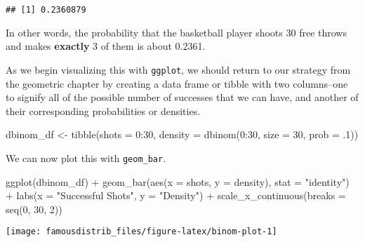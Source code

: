 \documentclass[
]{article}
\newenvironment{Shaded}{\begin{snugshade}}{\end{snugshade}}
\newcommand{\AttributeTok}[1]{\textcolor[rgb]{0.77,0.63,0.00}{#1}}
\newcommand{\DecValTok}[1]{\textcolor[rgb]{0.00,0.00,0.81}{#1}}
\newcommand{\FunctionTok}[1]{\textcolor[rgb]{0.00,0.00,0.00}{#1}}
\newcommand{\NormalTok}[1]{#1}
\newcommand{\OtherTok}[1]{\textcolor[rgb]{0.56,0.35,0.01}{#1}}
\newcommand{\SpecialCharTok}[1]{\textcolor[rgb]{0.00,0.00,0.00}{#1}}
\newcommand{\StringTok}[1]{\textcolor[rgb]{0.31,0.60,0.02}{#1}}
\begin{document}
\begin{verbatim}
## [1] 0.2360879
\end{verbatim}

In other words, the probability that the basketball player shoots 30 free throws and makes \textbf{exactly} 3 of them is about 0.2361.

As we begin visualizing this with \texttt{ggplot}, we should return to our strategy from the geometric chapter by creating a data frame or tibble with two columns--one to signify all of the possible number of successes that we can have, and another of their corresponding probabilities or densities.

\begin{Shaded}
\begin{Highlighting}[]
\NormalTok{dbinom\_df }\OtherTok{\textless{}{-}} \FunctionTok{tibble}\NormalTok{(}\AttributeTok{shots =} \DecValTok{0}\SpecialCharTok{:}\DecValTok{30}\NormalTok{,}
                 \AttributeTok{density =} \FunctionTok{dbinom}\NormalTok{(}\DecValTok{0}\SpecialCharTok{:}\DecValTok{30}\NormalTok{, }\AttributeTok{size =} \DecValTok{30}\NormalTok{, }\AttributeTok{prob =}\NormalTok{ .}\DecValTok{1}\NormalTok{))}
\end{Highlighting}
\end{Shaded}

We can now plot this with \texttt{geom\_bar}.

\begin{Shaded}
\begin{Highlighting}[]
\FunctionTok{ggplot}\NormalTok{(dbinom\_df) }\SpecialCharTok{+}
  \FunctionTok{geom\_bar}\NormalTok{(}\FunctionTok{aes}\NormalTok{(}\AttributeTok{x =}\NormalTok{ shots, }\AttributeTok{y =}\NormalTok{ density),}
           \AttributeTok{stat =} \StringTok{"identity"}\NormalTok{) }\SpecialCharTok{+}
  \FunctionTok{labs}\NormalTok{(}\AttributeTok{x =} \StringTok{"Successful Shots"}\NormalTok{, }\AttributeTok{y =} \StringTok{"Density"}\NormalTok{) }\SpecialCharTok{+}
  \FunctionTok{scale\_x\_continuous}\NormalTok{(}\AttributeTok{breaks =} \FunctionTok{seq}\NormalTok{(}\DecValTok{0}\NormalTok{, }\DecValTok{30}\NormalTok{, }\DecValTok{2}\NormalTok{))}
\end{Highlighting}
\end{Shaded}

\begin{center}\texttt{[image: famousdistrib\_files/figure-latex/binom-plot-1]} \end{center}
\end{document}
